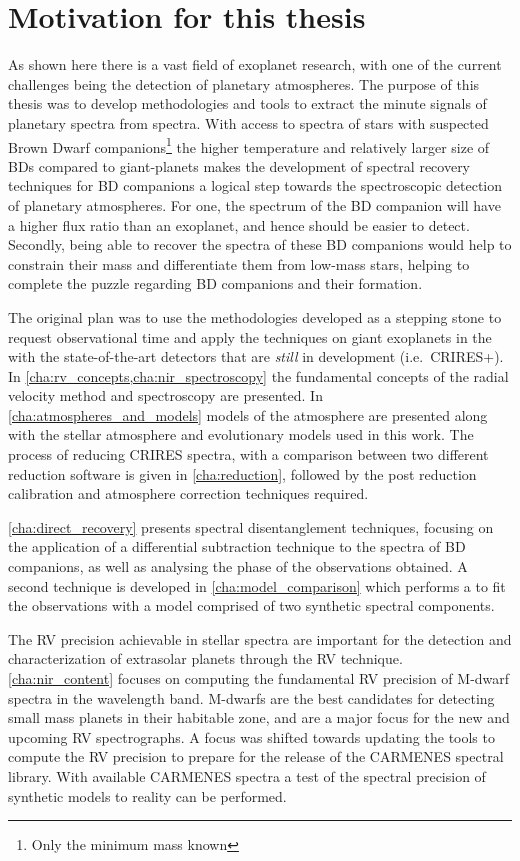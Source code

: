 \section{Motivation for this thesis}
\label{sec:thesis_motivation}

As shown here there is a vast field of exoplanet research, with one of the current challenges being the detection of planetary atmospheres.
The purpose of this thesis was to develop methodologies and tools to extract the minute signals of planetary spectra from \nir{} spectra.
With access to \nir{} spectra of stars with suspected Brown Dwarf companions\footnote{Only the minimum mass \Mtwosini{} known} the higher temperature and relatively larger size of {BD}s compared to giant-planets makes the development of spectral recovery techniques for {BD} companions a logical step towards the spectroscopic detection of planetary atmospheres.
For one, the spectrum of the {BD} companion will have a higher flux ratio than an exoplanet, and hence should be easier to detect.
Secondly, being able to recover the spectra of these {BD} companions would help to constrain their mass and differentiate them from low-mass stars, helping to complete the puzzle regarding {BD} companions and their formation.

The original plan was to use the methodologies developed as a stepping stone to request observational time and apply the techniques on giant exoplanets in the \nir{} with the state-of-the-art detectors that are \emph{still} in development (i.e.\ {CRIRES+}).
In \cref{cha:rv_concepts,cha:nir_spectroscopy} the fundamental concepts of the radial velocity method and \nir{} spectroscopy are presented.
In \cref{cha:atmospheres_and_models} models of the atmosphere are presented along with the stellar atmosphere and evolutionary models used in this work.
The process of reducing \nir{} {CRIRES} spectra, with a comparison between two different reduction software is given in \cref{cha:reduction}, followed by the post reduction calibration and atmosphere correction techniques required.

\cref{cha:direct_recovery} presents spectral disentanglement techniques, focusing on the application of a differential subtraction technique to the \nir{} spectra of {BD} companions, as well as analysing the phase of the observations obtained.
A second technique is developed in \cref{cha:model_comparison} which performs a to fit the observations with a model comprised of two synthetic spectral components.

The {RV} precision achievable in stellar spectra are important for the detection and characterization of extrasolar planets through the RV technique.
\cref{cha:nir_content} focuses on computing the fundamental {RV} precision of {M-dwarf} spectra in the \nir{} wavelength band.
{M-dwarf}s are the best candidates for detecting small mass planets in their habitable zone, and are a major focus for the new and upcoming \nir{} {RV} spectrographs.
A focus was shifted towards updating the tools to compute the {RV} precision to prepare for the release of the {CARMENES} \nir{} spectral library.
With available {CARMENES} spectra a test of the spectral precision of synthetic models to reality can be performed.
